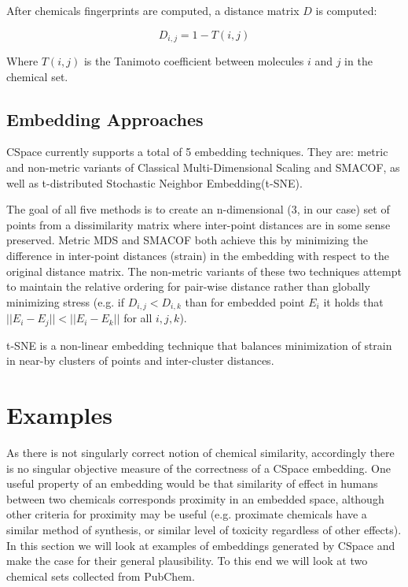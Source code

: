 \documentclass[12pt]{article}
\begin{document}
After chemicals fingerprints are computed, a distance matrix $D$ is computed:

\begin{equation}
  D_{i,j} = 1 - T(i,j)
\end{equation}

Where $T(i,j)$ is the Tanimoto coefficient between molecules $i$ and $j$ in the chemical set.

\subsection{Embedding Approaches}
CSpace currently supports a total of 5 embedding techniques. They are: metric and non-metric variants of Classical Multi-Dimensional Scaling and SMACOF, as well as t-distributed Stochastic Neighbor Embedding(t-SNE).

The goal of all five methods is to create an n-dimensional (3, in our case) set of points from a dissimilarity matrix where inter-point distances are in some sense preserved. Metric MDS and SMACOF both achieve this by minimizing the difference in inter-point distances (strain) in the embedding with respect to the original distance matrix. The non-metric variants of these two techniques attempt to maintain the relative ordering for pair-wise distance rather than globally minimizing stress (e.g. if $D_{i,j} < D_{i,k}$ than for embedded point $E_i$ it holds that $||E_i - E_j|| < ||E_i - E_k||$ for all $i, j, k$).

t-SNE is a non-linear embedding technique that balances minimization of strain in near-by clusters of points and inter-cluster distances\cite{maaten2008visualizing}.

\section{Examples}
As there is not singularly correct notion of chemical similarity, accordingly there is no singular objective measure of the correctness of a CSpace embedding. One useful property of an embedding would be that similarity of effect in humans between two chemicals corresponds proximity in an embedded space, although other criteria for proximity may be useful (e.g. proximate chemicals have a similar method of synthesis, or similar level of toxicity regardless of other effects). In this section we will look at examples of embeddings generated by CSpace and make the case for their general plausibility. To this end we will look at two chemical sets collected from PubChem.
\end{document}
